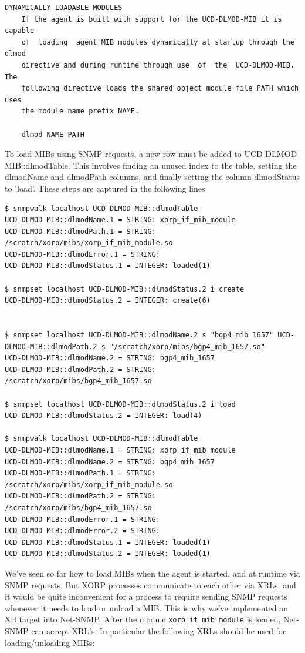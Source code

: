 \documentclass[11pt]{article}
\begin{document}
\begin{verbatim}
DYNAMICALLY LOADABLE MODULES
	If the agent is built with support for the UCD-DLMOD-MIB it is  capable
	of  loading  agent MIB modules dynamically at startup through the dlmod
	directive and during runtime through use  of  the  UCD-DLMOD-MIB.   The
	following directive loads the shared object module file PATH which uses
	the module name prefix NAME.

	dlmod NAME PATH
\end{verbatim}


To load MIBs using SNMP requests, a new row must be added to
UCD-DLMOD-MIB::dlmodTable.  This involves finding an unused index to the table,
setting the dlmodName and dlmodPath columns, and finally setting the column
dlmodStatus to 'load'.  These steps are captured in the following lines:

\begin{verbatim}
$ snmpwalk localhost UCD-DLMOD-MIB::dlmodTable
UCD-DLMOD-MIB::dlmodName.1 = STRING: xorp_if_mib_module
UCD-DLMOD-MIB::dlmodPath.1 = STRING: /scratch/xorp/mibs/xorp_if_mib_module.so
UCD-DLMOD-MIB::dlmodError.1 = STRING:
UCD-DLMOD-MIB::dlmodStatus.1 = INTEGER: loaded(1)

$ snmpset localhost UCD-DLMOD-MIB::dlmodStatus.2 i create
UCD-DLMOD-MIB::dlmodStatus.2 = INTEGER: create(6)


$ snmpset localhost UCD-DLMOD-MIB::dlmodName.2 s "bgp4_mib_1657" UCD-DLMOD-MIB::dlmodPath.2 s "/scratch/xorp/mibs/bgp4_mib_1657.so"
UCD-DLMOD-MIB::dlmodName.2 = STRING: bgp4_mib_1657
UCD-DLMOD-MIB::dlmodPath.2 = STRING: /scratch/xorp/mibs/bgp4_mib_1657.so

$ snmpset localhost UCD-DLMOD-MIB::dlmodStatus.2 i load
UCD-DLMOD-MIB::dlmodStatus.2 = INTEGER: load(4)

$ snmpwalk localhost UCD-DLMOD-MIB::dlmodTable
UCD-DLMOD-MIB::dlmodName.1 = STRING: xorp_if_mib_module
UCD-DLMOD-MIB::dlmodName.2 = STRING: bgp4_mib_1657
UCD-DLMOD-MIB::dlmodPath.1 = STRING: /scratch/xorp/mibs/xorp_if_mib_module.so
UCD-DLMOD-MIB::dlmodPath.2 = STRING: /scratch/xorp/mibs/bgp4_mib_1657.so
UCD-DLMOD-MIB::dlmodError.1 = STRING:
UCD-DLMOD-MIB::dlmodError.2 = STRING:
UCD-DLMOD-MIB::dlmodStatus.1 = INTEGER: loaded(1)
UCD-DLMOD-MIB::dlmodStatus.2 = INTEGER: loaded(1)
\end{verbatim}

We've seen so far how to load MIBs when the agent is started, and at runtime via SNMP requests.  But XORP processes communicate to each other via XRLs, and it would be quite inconvenient for a process to require sending SNMP requests whenever it needs to load or unload a MIB.  This is why we've implemented an Xrl target into Net-SNMP.  After the module \texttt{xorp\_if\_mib\_module} is loaded, Net-SNMP can accept XRL's.  In particular the following XRLs should be used for loading/unloading MIBs:
\end{document}
